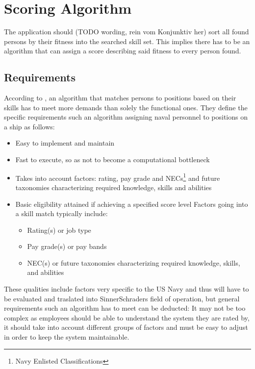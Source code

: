 \section{Scoring Algorithm}
The application should (TODO wording, rein vom Konjunktiv her) sort all found persons by their fitness into the searched skill set.
This implies there has to be an algorithm that can assign a score describing said fitness to every person found.

\subsection{Requirements}
According to \cite{USN}, an algorithm that matches persons to positions based on their skills has to meet more demands than solely the functional ones. They define the specific requirements such an algorithm assigning naval personnel to positions on a ship as follows:
\begin{itemize}
  \item Easy to implement and maintain
  \item Fast to execute, so as not to become a computational bottleneck
  \item Takes into account factors: rating, pay grade and NECs\footnote{Navy Enlisted Classifications} and future taxonomies characterizing required knowledge, skills and abilities
  \item Basic eligibility attained if achieving a specified score level Factors going into a skill match typically include:
  \begin{itemize}
    \item Rating(s) or job type
    \item Pay grade(s) or pay bands
    \item NEC(s) or future taxonomies characterizing required knowledge, skills, and abilities
  \end{itemize}
\end{itemize}\cite[P. 14]{USN}

These qualities include factors very specific to the US Navy and thus will have to be evaluated and traslated into SinnerSchraders field of operation, but general requirements such an algorithm has to meet can be deducted: It may not be too complex as employees should be able to understand the system they are rated by, it should take into account different groups of factors and must be easy to adjust in order to keep the system maintainable.

